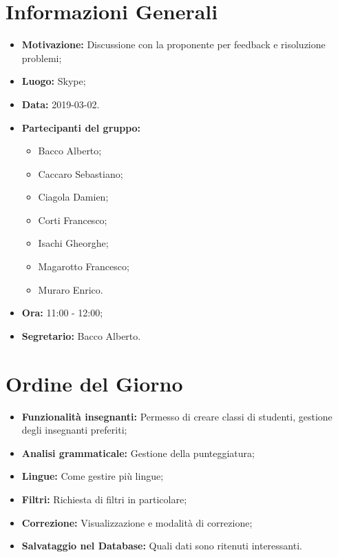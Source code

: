 \documentclass[a4paper, oneside, openany, dvipsnames, table]{article}
\begin{document}
\copertina{}


\newpage
\tableofcontents
\newpage
\section{Informazioni Generali}
\begin{itemize}
\item \textbf{Motivazione:} Discussione con la proponente per feedback e risoluzione problemi;
\item \textbf{Luogo:} Skype;
\item \textbf{Data:} 2019-03-02.
\item \textbf{Partecipanti del gruppo:} \hfill
	\begin{itemize}
	\item Bacco Alberto;
	\item Caccaro Sebastiano;
	\item Ciagola Damien;
	\item Corti Francesco;
	\item Isachi Gheorghe;
	\item Magarotto Francesco;
	\item Muraro Enrico.
	\end{itemize} 
\item \textbf{Ora:} 11:00 - 12:00;
\item \textbf{Segretario:} Bacco Alberto.
\end{itemize}

\section{Ordine del Giorno}
\begin{itemize}
	\item \textbf{Funzionalità insegnanti:} Permesso di creare classi di studenti, gestione degli insegnanti preferiti;
	\item \textbf{Analisi grammaticale:} Gestione della punteggiatura;
	\item \textbf{Lingue:} Come gestire più lingue;
	\item \textbf{Filtri:} Richiesta di filtri in particolare;
	\item \textbf{Correzione:} Visualizzazione e modalità di correzione;
	\item \textbf{Salvataggio nel Database:} Quali dati sono ritenuti interessanti.
\end{itemize}
\end{document}
